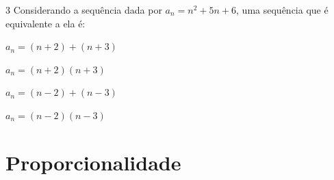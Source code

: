 

\num{3} Considerando a sequência dada por $a_{n} = n^{2} + 5n + 6$, uma
sequência que é equivalente a ela é:

\begin{escolha}
\item $a_{n} = (n + 2) + (n + 3)$
\item $a_{n} = (n + 2)(n + 3)$
\item $a_{n} = (n - 2) + (n - 3)$
\item $a_{n} = (n - 2)(n - 3)$
\end{escolha}




\chapter{Proporcionalidade}

